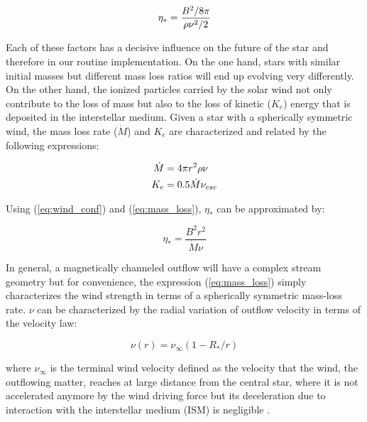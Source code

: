 \documentclass[fleqn,usenatbib]{mnras}
\begin{document}
\begin{ceqn}
\begin{equation}
    \eta_* = \frac{B^{2}/8\pi}{\rho\nu^2/2} \label{eq:wind_conf}
\end{equation}
\end{ceqn}

Each of these factors has a decisive influence on the future of the star and therefore in our routine implementation. On the one hand, stars with similar initial masses but different mass loss ratios will end up evolving very differently. On the other hand, the ionized particles carried by the solar wind not only contribute to the loss of mass but also to the loss of kinetic ($K_e$) energy that is deposited in the interstellar medium. Given a star with a spherically symmetric wind, the mass loss rate ($\Dot{M}$) and $K_e$ are characterized and related by the following expressions:

\begin{ceqn}
\begin{align}
    \Dot{M} &= 4\pi r^2\rho\nu \label{eq:mass_loss}\\
    K_e &= 0.5\Dot{M}\nu_{esc}
\end{align}
\end{ceqn}

Using (\ref{eq:wind_conf}) and (\ref{eq:mass_loss}), $\eta_*$ can be approximated by: 
\begin{ceqn}
\begin{equation}
    \eta_* = \frac{B^{2}r^{2}}{\Dot{M}\nu} \label{eq:wind_conf2}
\end{equation}
\end{ceqn}

In general, a magnetically channeled outflow will have a complex stream geometry but for convenience, the expression (\ref{eq:mass_loss}) simply characterizes the wind strength in terms of a spherically symmetric mass-loss rate. $\nu$ can be characterized by the radial variation of outflow velocity in terms of the velocity law:
\begin{ceqn}
\begin{equation}
    \nu(r) = \nu_\infty (1-R_*/r)
\end{equation}
\end{ceqn}
where $\nu_\infty$ is the terminal wind velocity defined as the velocity that the wind, the outflowing matter, reaches at large distance from the central star, where it is not accelerated anymore by the wind driving force but its deceleration due to interaction with the interstellar medium (ISM) is negligible \citep{Niedzielski2002}.\par
\end{document}
